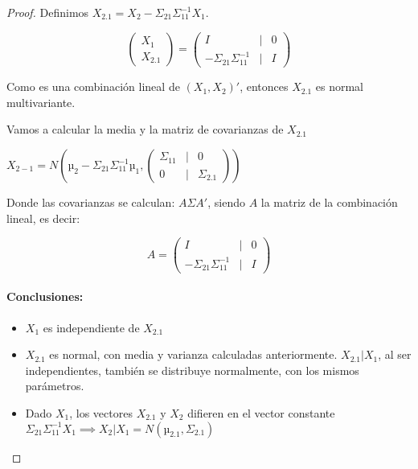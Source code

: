 \begin{proof}
Definimos $X_{2.1} = X_2 - Σ_{21}Σ_{11}^{-1}X_1$.

\[
\begin{pmatrix}
X_1\\
X_{2.1}
\end{pmatrix} =
\begin{pmatrix}
I &| &0\\
\hline
- Σ_{21}Σ_{11}^{-1}  &| &I
 \end{pmatrix}
\]

Como es una combinación lineal de $(X_1,X_2)'$, entonces $X_{2.1}$ es normal multivariante.

Vamos a calcular la media y la matriz de covarianzas de $X_{2.1}$

$X_{2-1} = N\left( µ_2-Σ_{21}Σ_{11}^{-1}µ_1 , \begin{pmatrix} Σ_{11} &|&0\\\hline 0&|&Σ_{2.1} \end{pmatrix} \right)$

Donde las covarianzas se calculan: $AΣA'$, siendo $A$ la matriz de la combinación lineal, es decir:

\[
A=\begin{pmatrix}
I &| &0\\
\hline
- Σ_{21}Σ_{11}^{-1}  &| &I
 \end{pmatrix}
\]



\paragraph{Conclusiones:}

\begin{itemize}
	\item $X_1$ es independiente de $X_{2.1}$
	\item $X_{2.1}$ es normal, con media y varianza calculadas anteriormente.
	\subitem $X_{2.1}|X_1$, al ser independientes, también se distribuye normalmente, con los mismos parámetros.
	\item Dado $X_1$, los vectores $X_{2.1}$ y $X_2$  difieren en el vector constante $Σ_{21}Σ_{11}^{-1}X_1 \implies X_2|X_1 = N\left( µ_{2.1}, Σ_{2.1} \right)$
\end{itemize}

\end{proof}

